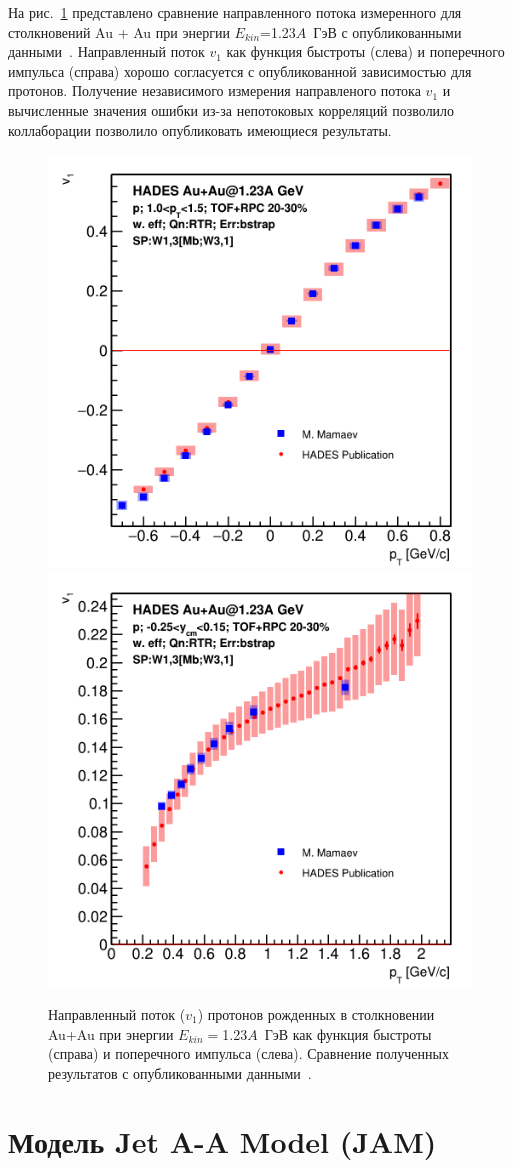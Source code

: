 На рис.~\ref{fig:hades_v1_publ_comparison} представлено сравнение направленного потока измеренного для столкновений Au + Au при энергии $E_{kin}$=1.23$A$~ГэВ с опубликованными данными~\cite{HADES:2020lob}.
Направленный поток $v_1$ как функция быстроты (слева) и поперечного импульса (справа) хорошо согласуется с опубликованной зависимостью для протонов.
Получение независимого измерения направленого потока $v_1$ и вычисленные значения ошибки из-за непотоковых корреляций позволило коллаборации позволило опубликовать имеющиеся результаты.
%
\begin{figure}[ht]
\begin{center}
\includegraphics[width=0.45\linewidth]{images/v1_au123_publication_ycm.png}
\includegraphics[width=0.45\linewidth]{images/v1_au123_publication_pT.png}
\caption{Направленный поток ($v_1$) протонов  рожденных в столкновении Au+Au при энергии $E_{kin}=$1.23$A$~ГэВ как функция быстроты (справа) и поперечного импульса (слева). Сравнение полученных результатов с опубликованными данными~\cite{HADES:2020lob}. }
\label{fig:hades_v1_publ_comparison}
\end{center}
\end{figure}

\section{Модель Jet A-A Model (JAM)}

